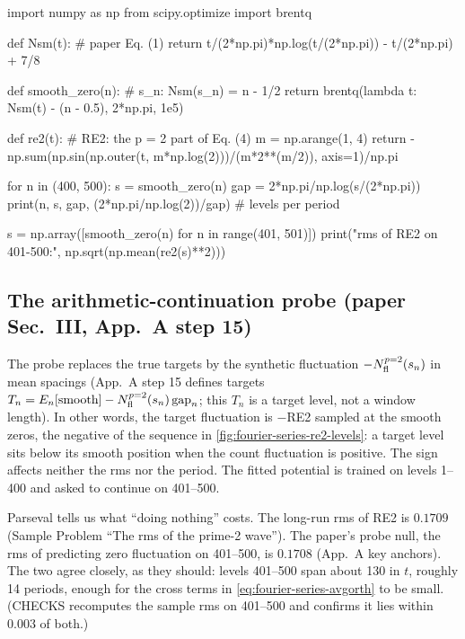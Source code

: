 \begin{pycode}
import numpy as np
from scipy.optimize import brentq

def Nsm(t):                        # paper Eq. (1)
    return t/(2*np.pi)*np.log(t/(2*np.pi)) - t/(2*np.pi) + 7/8

def smooth_zero(n):                # s_n: Nsm(s_n) = n - 1/2
    return brentq(lambda t: Nsm(t) - (n - 0.5), 2*np.pi, 1e5)

def re2(t):                        # RE2: the p = 2 part of Eq. (4)
    m = np.arange(1, 4)
    return -np.sum(np.sin(np.outer(t, m*np.log(2)))/(m*2**(m/2)), axis=1)/np.pi

for n in (400, 500):
    s = smooth_zero(n)
    gap = 2*np.pi/np.log(s/(2*np.pi))
    print(n, s, gap, (2*np.pi/np.log(2))/gap)    # levels per period

s = np.array([smooth_zero(n) for n in range(401, 501)])
print("rms of RE2 on 401-500:", np.sqrt(np.mean(re2(s)**2)))
\end{pycode}

\subsection{The arithmetic-continuation probe (paper Sec.~III, App.~A step 15)}

The probe replaces the true targets by the synthetic fluctuation $-N^{p=2}_{\rm fl}(s_n)$ in mean spacings (App.~A step 15 defines targets $T_n=E_n[\text{smooth}]-N^{p=2}_{\rm fl}(s_n)\,\mathrm{gap}_n$; this $T_n$ is a target level, not a window length). In other words, the target fluctuation is $-$RE2 sampled at the smooth zeros, the negative of the sequence in \cref{fig:fourier-series-re2-levels}: a target level sits below its smooth position when the count fluctuation is positive. The sign affects neither the rms nor the period. The fitted potential is trained on levels 1--400 and asked to continue on 401--500.

Parseval tells us what ``doing nothing'' costs. The long-run rms of RE2 is $0.1709$ (Sample Problem ``The rms of the prime-2 wave''). The paper's probe null, the rms of predicting zero fluctuation on 401--500, is $0.1708$ (App.~A key anchors). The two agree closely, as they should: levels 401--500 span about 130 in $t$, roughly 14 periods, enough for the cross terms in \cref{eq:fourier-series-avgorth} to be small. (CHECKS recomputes the sample rms on 401--500 and confirms it lies within $0.003$ of both.)

